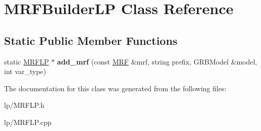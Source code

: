\hypertarget{classMRFBuilderLP}{
\section{MRFBuilderLP Class Reference}
\label{classMRFBuilderLP}
}
\subsection*{Static Public Member Functions}
\begin{DoxyCompactItemize}
\item 
\hypertarget{classMRFBuilderLP_aaace30ed1c0dfb1b0c5c89a22b503e10}{
static \hyperlink{structMRFLP}{MRFLP} $\ast$ {\bfseries add\_\-mrf} (const \hyperlink{classMRF}{MRF} \&mrf, string prefix, GRBModel \&model, int var\_\-type)}
\label{classMRFBuilderLP_aaace30ed1c0dfb1b0c5c89a22b503e10}

\end{DoxyCompactItemize}


The documentation for this class was generated from the following files:\begin{DoxyCompactItemize}
\item 
lp/MRFLP.h\item 
lp/MRFLP.cpp\end{DoxyCompactItemize}
